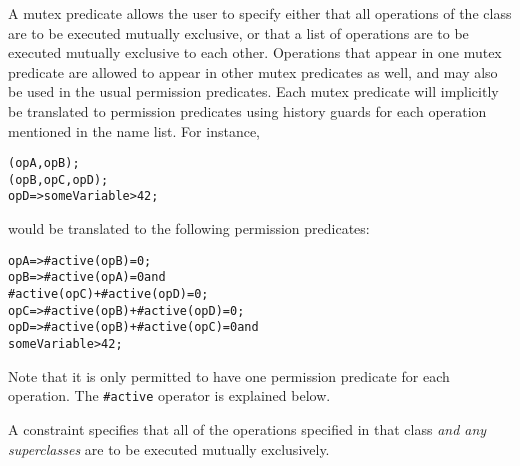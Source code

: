 \documentclass[\pformat,12pt]{article}
\begin{document}
\begin{description}
A mutex predicate allows the user to specify either that all
operations of the class are to be executed mutually exclusive, or that
a list of operations are to be executed mutually exclusive to each
other. Operations that appear in one mutex predicate are allowed to
appear in other mutex predicates as well, and may also be used in the
usual permission predicates. Each mutex predicate will implicitly be
translated to permission predicates using history guards for each
operation mentioned in the name list. For instance,  
\begin{alltt}
  (opA, opB);
  (opB, opC, opD);
   opD => someVariable > 42;
\end{alltt}
would be translated to the following permission predicates: 
\begin{alltt}
   opA => #active(opB) = 0;
   opB => #active(opA) = 0 and
          #active(opC) + #active(opD) = 0;
   opC => #active(opB) + #active(opD) = 0;
   opD => #active(opB) + #active(opC) = 0 and
          someVariable > 42;
\end{alltt}

Note that it is only permitted to have one permission predicate for each
operation. The
\texttt{\#active} operator is explained below.

A  constraint specifies that all of the operations
specified in that class \textit{and any superclasses} are to be
executed mutually exclusively. 
\end{description}
\end{document}

